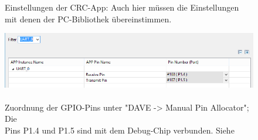 \begin{figure}[!h]
\begin{minipage}{0.45\textwidth}
    \caption{Einstellungen der CRC-App: Auch hier müssen die Einstellungen mit denen der PC-Bibliothek übereinstimmen.}
  \end{minipage}
  \begin{minipage}{0.45\textwidth}
    \centering
    \includegraphics[width=\textwidth]{PinAlloc}
    \caption{Zuordnung der GPIO-Pins unter "DAVE -> Manual Pin Allocator"; Die \\Pins P1.4 und P1.5 sind mit dem Debug-Chip verbunden. Siehe \cite[Table 5]{boardMan}}
    \label{fig:dave6}
  \end{minipage}
\begin{minipage}{0.45\textwidth}
	\centering
	\includegraphics{space}
\end{minipage}
\begin{minipage}{0.45\textwidth}
	\centering
	\includegraphics{space}
\end{minipage}
\end{figure}
\newpage
